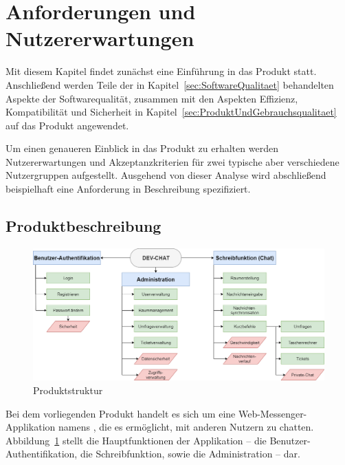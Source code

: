\section{Anforderungen und Nutzererwartungen}
Mit diesem Kapitel findet zunächst eine Einführung in das Produkt  statt.
Anschließend werden Teile der in Kapitel~\ref{sec:SoftwareQualitaet} behandelten Aspekte der Softwarequalität, zusammen mit den Aspekten Effizienz, Kompatibilität und Sicherheit in Kapitel~\ref{sec:ProduktUndGebrauchsqualitaet} auf das Produkt angewendet.

\noindent{}Um einen genaueren Einblick in das Produkt zu erhalten werden Nutzererwartungen und Akzeptanzkriterien für zwei typische aber verschiedene Nutzergruppen aufgestellt.
Ausgehend von dieser Analyse wird abschließend beispielhaft eine Anforderung in  Beschreibung spezifiziert.

\subsection{Produktbeschreibung}
\begin{figure}
  \centering
  \includegraphics[width=1\textwidth, keepaspectratio]{images/Produktstruktur.png}
  \caption{Produktstruktur}
  \label{fig:Produktstruktur}
\end{figure}
Bei dem vorliegenden Produkt handelt es sich um eine Web-Messenger-Applikation namens , die es ermöglicht, mit anderen Nutzern zu chatten.
Abbildung~\ref{fig:Produktstruktur} stellt die Hauptfunktionen der Applikation -- die Benutzer-Authentifikation, die Schreibfunktion, sowie die Administration -- dar.

